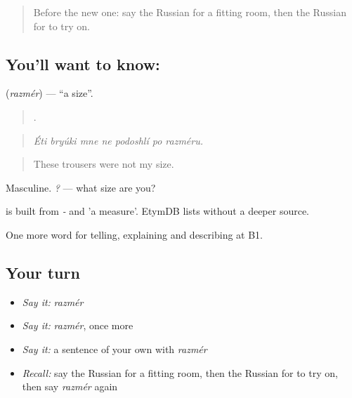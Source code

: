 \label{lesson:RU-C453-razmer}



\begin{quote}
Before the new one: say the Russian for a fitting room, then the Russian for to try on.
\end{quote}

\subsection*{You'll want to know: }
\textbf{} (\emph{razmér}) — \textquotedblleft{}a size\textquotedblright{}.

\begin{quote}
      .
\end{quote}

\begin{quote}
\emph{Éti bryúki mne ne podoshlí po razméru.}
\end{quote}

\begin{quote}
These trousers were not my size.
\end{quote}

Masculine. \emph{   ?} — what size are you?

\begin{cousinweb}
\emph{} is built from \emph{-} and \emph{} 'a measure'. EtymDB lists \emph{} without a deeper source.
\end{cousinweb}

\begin{grammarlens}[title={What you've built}]
One more word for telling, explaining and describing at B1.
\end{grammarlens}

\subsection*{Your turn}
\begin{itemize}
\raggedright
  \item \emph{Say it:} \emph{razmér}
  \item \emph{Say it:} \emph{razmér}, once more
  \item \emph{Say it:} a sentence of your own with \emph{razmér}
  \item \emph{Recall:} say the Russian for a fitting room, then the Russian for to try on, then say \emph{razmér} again
\end{itemize}


